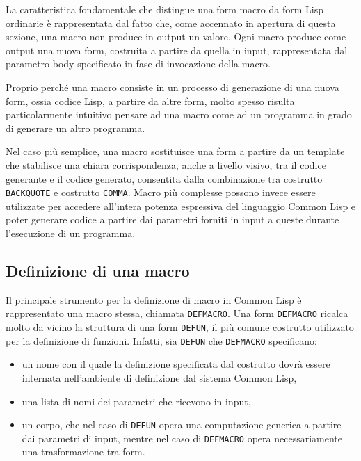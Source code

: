 La caratteristica fondamentale che distingue una form macro da form Lisp
ordinarie è rappresentata dal fatto che, come accennato in apertura di questa
sezione, una macro non produce in output un valore. Ogni macro produce come
output una nuova form, costruita a partire da quella in input, rappresentata dal
parametro body specificato in fase di invocazione della macro.

Proprio perché una macro consiste in un processo di generazione di una nuova
form, ossia codice Lisp, a partire da altre form, molto spesso risulta
particolarmente intuitivo pensare ad una macro come ad un programma in grado di
generare un altro programma.

Nel caso più semplice, una macro sostituisce una form a partire da un template
che stabilisce una chiara corrispondenza, anche a livello visivo, tra il codice
generante e il codice generato, consentita dalla combinazione tra costrutto
\texttt{BACKQUOTE} e costrutto \texttt{COMMA}. Macro più complesse possono
invece essere utilizzate per accedere all’intera potenza espressiva del
linguaggio Common Lisp e poter generare codice a partire dai parametri forniti
in input a queste durante l’esecuzione di un programma.

\subsection{Definizione di una macro}

Il principale strumento per la definizione di macro in Common Lisp è
rappresentato una macro stessa, chiamata \texttt{DEFMACRO}. Una form
\texttt{DEFMACRO} ricalca molto da vicino la struttura di una form
\texttt{DEFUN}, il più comune costrutto utilizzato per la definizione di
funzioni. Infatti, sia \texttt{DEFUN} che \texttt{DEFMACRO} specificano:

\begin{itemize}

\item un nome con il quale la definizione specificata dal costrutto dovrà essere
internata nell'ambiente di definizione dal sistema Common Lisp,

\item una lista di nomi dei parametri che ricevono in input,

\item un corpo, che nel caso di \texttt{DEFUN} opera una computazione generica a
partire dai parametri di input, mentre nel caso di \texttt{DEFMACRO} opera
necessariamente una trasformazione tra form.

\end{itemize}

